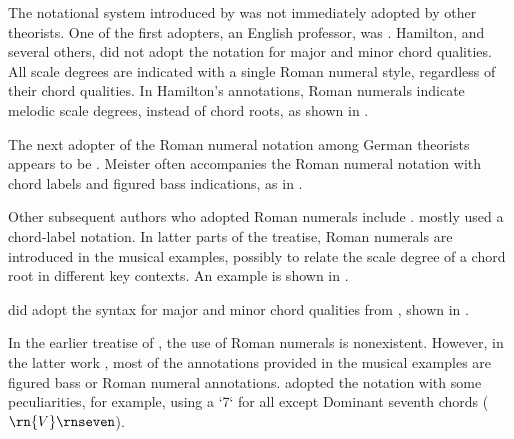 

The notational system introduced by
\textcite{weber1817versuch} was not immediately adopted by
other theorists. One of the first adopters, an English
professor, was \textcite{hamilton1840catechism}. Hamilton,
and several others, did not adopt the notation for major and
minor chord qualities. All scale degrees are indicated with
a single Roman numeral style, regardless of their chord
qualities. In Hamilton's annotations, Roman numerals
indicate melodic scale degrees, instead of chord roots, as
shown in .


The next adopter of the Roman numeral notation among German
theorists appears to be \textcite{meister1852vollstandige}.
Meister often accompanies the Roman numeral notation with
chord labels and figured bass indications, as in
.


Other subsequent authors who adopted Roman numerals include
\parencite{sechter1853grundsatze, richter1860lehrbuch,
tiersch1874elementarbuch, tracy1878theory}.
\textcite{sechter1853grundsatze} mostly used a chord-label
notation. In latter parts of the treatise, Roman numerals
are introduced in the musical examples, possibly to relate
the scale degree of a chord root in different key contexts.
An example is shown in
.


\textcite{richter1860lehrbuch} did adopt the syntax for
major and minor chord qualities from
\textcite{weber1817versuch}, shown in
.

In the earlier treatise of \textcite{tiersch1868system}, the
use of Roman numerals is nonexistent. However, in the latter
work \textcite{tiersch1874elementarbuch}, most of the
annotations provided in the musical examples are figured
bass or Roman numeral annotations.
\textcite{tracy1878theory} adopted the notation with some
peculiarities, for example, using a `7` for all except
Dominant seventh chords ($\rn{V}\rnseven$).

